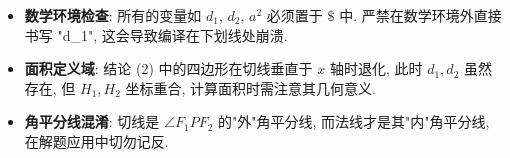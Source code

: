 \begin{trapbox}
\begin{itemize}
    \item \textbf{数学环境检查}: 所有的变量如 $d_1$, $d_2$, $a^2$ 必须置于 $ \$ $ 中. 严禁在数学环境外直接书写 "d\_1", 这会导致编译在下划线处崩溃.
    \item \textbf{面积定义域}: 结论 (2) 中的四边形在切线垂直于 $x$ 轴时退化, 此时 $d_1, d_2$ 虽然存在, 但 $H_1, H_2$ 坐标重合, 计算面积时需注意其几何意义.
    \item \textbf{角平分线混淆}: 切线是 $\angle F_1PF_2$ 的"外"角平分线, 而法线才是其"内"角平分线, 在解题应用中切勿记反.
\end{itemize}
\end{trapbox}